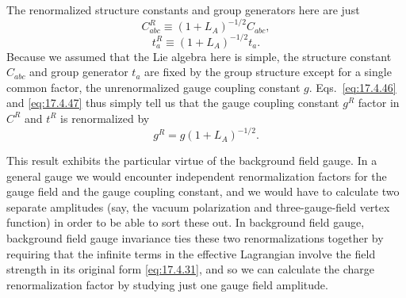 The renormalized structure constants and group generators here are just
\begin{equation}
C_{abc}^R\equiv
(1+L_A)^{-1/2}C_{abc},
\label{eq:17.4.46}
\end{equation}
\begin{equation}
t_a^R\equiv(1+L_A)^{-1/2}t_a.
\label{eq:17.4.47}
\end{equation}
Because we assumed that the Lie algebra here is simple, the structure
constant $C_{abc}$ and group generator $t_a$ are fixed by
the group structure except for a single common factor, the unrenormalized
gauge coupling constant $g$. Eqs.~\eqref{eq:17.4.46} and
\eqref{eq:17.4.47} thus simply tell us that the gauge coupling constant
$g^R$ factor in $C^R$ and $t^R$ is renormalized by
\begin{equation}
g^R=g(1+L_A)^{-1/2}.
\label{eq:17.4.48}
\end{equation}

This result exhibits the particular virtue of the background field gauge.
In a general gauge we would encounter independent renormalization factors
for the gauge field and the gauge coupling constant, and we would have to
calculate two separate amplitudes (say, the vacuum polarization and
three-gauge-field vertex function) in order to be able to sort these out.
In background field gauge, background field gauge invariance ties these two
renormalizations together by requiring that the infinite terms in the
effective Lagrangian involve the field strength in its original form
\eqref{eq:17.4.31}, and so we can calculate the charge renormalization factor
by studying just one gauge field amplitude.
